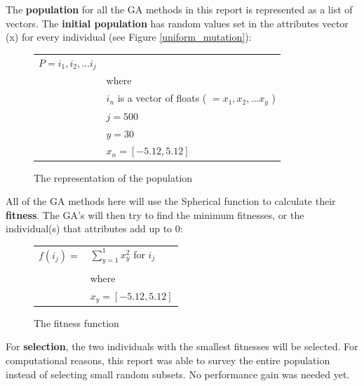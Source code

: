 \documentclass[12pt]{article}
\begin{document}
The \textbf{population} for all the GA methods in this report is represented as a list of vectors. The \textbf{initial population} has random values set in the attributes vector (x) for every individual (see Figure \ref{uniform_mutation}):
\begin{figure}[!h]
        \begin{center}
		\begin{tabular}{r l}
	                $ P = i_1, i_2, ... i_j $	& \\
								& where \\
								& $ i_n $ is a vector of floats ( $ = x_1, x_2, ... x_y $ ) \\
								& $ j = 500 $ \\
								& $ y = 30 $ \\
								& $ x_n = [-5.12, 5.12] $
		\end{tabular} 
               \caption{The representation of the population}
                \label{population}
        \end{center}
\end{figure}

All of the GA methods here will use the Spherical function to calculate their \textbf{fitness}. The GA's will then try to find the minimum fitnesses, or the individual(s) that attributes add up to 0:
\begin{figure}[!h]
        \begin{center}
		\begin{tabular}{r l}
			$ f(i_j) = $			&	$ \sum_{y=1}^{1}x_y^2	$ for $ i_j $ \\
								& \\
								&	where \\
								&	$ x_y = [-5.12, 5.12 ] $ \\
		\end{tabular} 
               \caption{The fitness function}
                \label{fitness}
        \end{center}
\end{figure}

For \textbf{selection}, the two individuals with the smallest fitnesses will be selected. For computational reasons, this report was able to survey the entire population instead of selecting small random subsets. No performance gain was needed yet.
\end{document}
